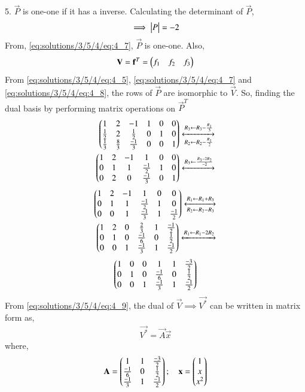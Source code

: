 5. $\vec{P}$ is one-one if it has a inverse. Calculating the determinant of $\vec{P}$,
\begin{align}
    \implies \begin{vmatrix}P\end{vmatrix} = -2 \label{eq:solutions/3/5/4/eq:4_7}
\end{align}
From, \eqref{eq:solutions/3/5/4/eq:4_7}, $\vec{P}$ is one-one. Also,
\begin{align}
    \mathbf{V} = \mathbf{f}^T = \begin{pmatrix}f_1 & f_2 & f_3\end{pmatrix} \label{eq:solutions/3/5/4/eq:4_8} 
\end{align}
From \eqref{eq:solutions/3/5/4/eq:4_5}, \eqref{eq:solutions/3/5/4/eq:4_7} and \eqref{eq:solutions/3/5/4/eq:4_8}, the rows of $\vec{P}$ are isomorphic to $\vec{V}$. So, finding the dual basis by performing matrix operations on $\vec{P}^T$
\begin{align}
    \begin{pmatrix}1 & 2 & -1 & 1 & 0 & 0 \\
    \frac{1}{2} & 2 & \frac{1}{2} & 0 & 1 & 0\\
    \frac{1}{3} & \frac{8}{3} & \frac{-1}{3} & 0 & 0 & 1\end{pmatrix} \xleftrightarrow[R_2\leftarrow R_2-\frac{R_1}{2}]{R_3\leftarrow R_3-\frac{R_1}{3}} \nonumber \\
    \begin{pmatrix}1 & 2 & -1 & 1 & 0 & 0 \\ 
    0 & 1 & 1 & \frac{-1}{2} & 1 & 0 \\
    0 & 2 & 0 & \frac{-1}{3} & 0 & 1\end{pmatrix}
    \xleftrightarrow[]{R_3 \leftarrow \frac{R_3-2R_2}{-2}} \nonumber
\end{align}
\begin{align}
    \begin{pmatrix}1 & 2 & -1 & 1 & 0 & 0 \\ 
    0 & 1 & 1 & \frac{-1}{2} & 1 & 0 \\
    0 & 0 & 1 & \frac{-1}{3} & 1 & \frac{-1}{2}\end{pmatrix} 
    \xleftrightarrow[R_2 \leftarrow R_2 - R_3]{R_1 \leftarrow R_1 + R_3} \nonumber \\
    \begin{pmatrix}1 & 2 & 0 & \frac{2}{3} & 1 & \frac{-1}{2} \\ 
    0 & 1 & 0 & \frac{-1}{6} & 0 & \frac{1}{2} \\
    0 & 0 & 1 & \frac{-1}{3} & 1 & \frac{-1}{2}\end{pmatrix} 
    \xleftrightarrow[]{R_1\leftarrow R_1-2R_2} \nonumber
\end{align}
\begin{align}
    \begin{pmatrix}1 & 0 & 0 & 1 & 1 & \frac{-3}{2} \\
    0 & 1 & 0 & \frac{-1}{6} & 0 & \frac{1}{2} \\
    0 & 0 & 1 & \frac{-1}{3} & 1 & \frac{-1}{2}\end{pmatrix} \label{eq:solutions/3/5/4/eq:4_9}
\end{align}
From \eqref{eq:solutions/3/5/4/eq:4_9}, the dual of $\vec{V} \implies \vec{V^*}$ can be written in matrix form as,
\begin{align}
    \vec{V^*} = \vec{A}\vec{x} \label{eq:solutions/3/5/4/eq:4_10}
\end{align}
where,
\begin{align}
    \mathbf{A} = \begin{pmatrix}1 & 1 & \frac{-3}{2} \\
    \frac{-1}{6} & 0 & \frac{1}{2} \\
    \frac{-1}{3} & 1 & \frac{-1}{2}\end{pmatrix}; \quad 
    \mathbf{x} = \begin{pmatrix}1 \\ x \\ x^2\end{pmatrix} \nonumber
\end{align}
